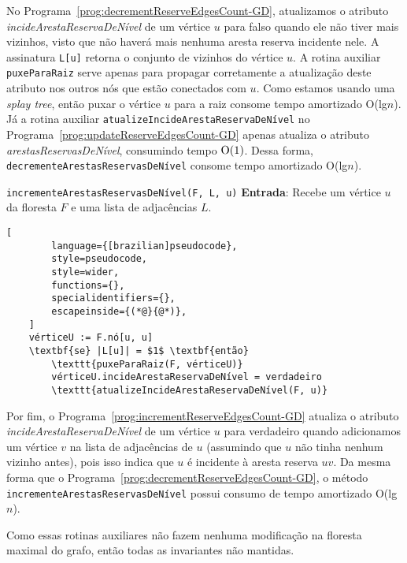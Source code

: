 No Programa~\ref{prog:decrementReserveEdgesCount-GD}, atualizamos o atributo \textit{incideArestaReservaDeNível} de um vértice $u$ para falso quando ele não tiver mais vizinhos, visto que não haverá mais nenhuma aresta reserva incidente nele. A assinatura \texttt{L[u]} retorna o conjunto de vizinhos do vértice $u$. A rotina auxiliar \texttt{puxeParaRaiz} serve apenas para propagar corretamente a atualização deste atributo nos outros nós que estão conectados com $u$. Como estamos usando uma \textit{splay tree}, então puxar o vértice $u$ para a raiz consome tempo amortizado O(lg$n$). Já a rotina auxiliar \texttt{atualizeIncideArestaReservaDeNível} no Programa~\ref{prog:updateReserveEdgesCount-GD} apenas atualiza o atributo \textit{arestasReservasDeNível}, consumindo tempo $\mathrm{O}(1)$. Dessa forma, \texttt{decrementeArestasReservasDeNível} consome tempo amortizado O(lg$n$).

\begin{programruledcaption}{\texttt{incrementeArestasReservasDeNível(F, L, u)} \label{prog:incrementReserveEdgesCount-GD}}
    \noindent\textbf{Entrada}: Recebe um vértice $u$ da floresta $F$ e uma lista de adjacências $L$.
    \vspace{-0.5\baselineskip}
    \begin{lstlisting}[
        language={[brazilian]pseudocode},
        style=pseudocode,
        style=wider,
        functions={},
        specialidentifiers={},
        escapeinside={(*@}{@*)},
    ]
    vérticeU := F.nó[u, u]
    \textbf{se} |L[u]| = $1$ \textbf{então} 
        \texttt{puxeParaRaiz(F, vérticeU)}
        vérticeU.incideArestaReservaDeNível = verdadeiro
        \texttt{atualizeIncideArestaReservaDeNível(F, u)}
    \end{lstlisting}
    \vspace{-0.5\baselineskip}
\end{programruledcaption}

Por fim, o Programa~\ref{prog:incrementReserveEdgesCount-GD} atualiza o atributo \textit{incideArestaReservaDeNível} de um vértice $u$ para verdadeiro quando adicionamos um vértice $v$ na lista de adjacências de $u$ (assumindo que $u$ não tinha nenhum vizinho antes), pois isso indica que $u$ é incidente à aresta reserva $uv$. Da mesma forma que o Programa~\ref{prog:decrementReserveEdgesCount-GD}, o método \texttt{incrementeArestasReservasDeNível} possui consumo de tempo amortizado O(lg$n$).

Como essas rotinas auxiliares não fazem nenhuma modificação na floresta maximal do grafo, então todas as invariantes não mantidas.

